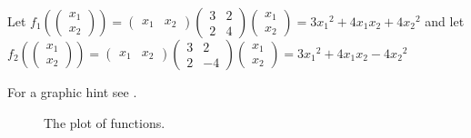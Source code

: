 \documentclass[computationalMathematics.tex]{subfiles}
\begin{document}
\begin{example}
  Let $f_1(\begin{pmatrix} x_1\\ x_2 \end{pmatrix}) = \begin{pmatrix} x_1 & x_2 \end{pmatrix} \begin{pmatrix} 3 & 2 \\ 2 & 4 \end{pmatrix}\begin{pmatrix} x_1\\ x_2 \end{pmatrix} = 3 {x_1}^2 + 4 x_1 x_2 + 4 {x_2}^2$ and let $f_2(\begin{pmatrix} x_1\\ x_2 \end{pmatrix}) = \begin{pmatrix} x_1 & x_2 \end{pmatrix} \begin{pmatrix} 3 & 2 \\ 2 & -4 \end{pmatrix}\begin{pmatrix} x_1\\ x_2 \end{pmatrix} = 3 {x_1}^2 + 4 x_1 x_2 -4 {x_2}^2$

For a graphic hint see .

\begin{figure}[h!]
	\centering\scriptsize
	\hspace*{\fill}
   \hfill
   \hspace*{\fill}
	\caption{The plot of functions.}\label{fig:26sett_quadratic}
\end{figure}

\end{example}
\end{document}
